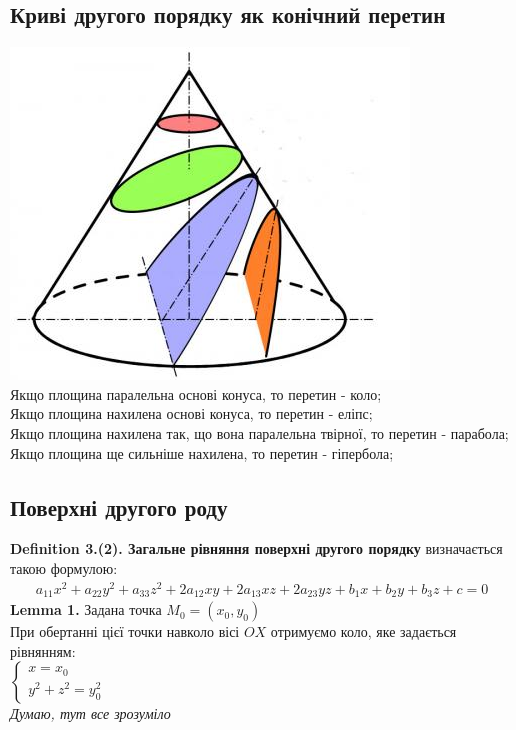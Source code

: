 \documentclass[a4paper, 14pt]{extarticle}
\def\defin#1{\textbf{Definition {#1}}}
\def\lm#1{\textbf{Lemma {#1}}}
\def\bigline{\vspace{5mm}\\}
\begin{document}
\subsection{Криві другого порядку як конічний перетин}
\includegraphics[width=.5\textwidth]{cone_intersection.jpg}\\
Якщо площина паралельна основі конуса, то перетин - коло;\\
Якщо площина нахилена основі конуса, то перетин - еліпс;\\
Якщо площина нахилена так, що вона паралельна твірної, то перетин - парабола;\\
Якщо площина ще сильніше нахилена, то перетин - гіпербола;
\bigline
\subsection*{Поверхні другого роду}
\defin{3.(2). Загальне рівняння поверхні другого порядку} визначається такою формулою:
\begin{align*}
a_{11}x^2 + a_{22}y^2 + a_{33}z^2 + 2a_{12}xy + 2a_{13}xz + 2a_{23}yz + b_1x + b_2y + b_3z + c = 0
\end{align*}
\lm{1.} Задана точка $M_0 = (x_0,y_0)$\\
При обертанні цієї точки навколо вісі $OX$ отримуємо коло, яке задається рівнянням:\\
$\begin{cases}
x = x_0 \\
y^2 + z^2 = y_0^2
\end{cases}
$\\
\textit{Думаю, тут все зрозуміло}\\
\bigline
\end{document}
